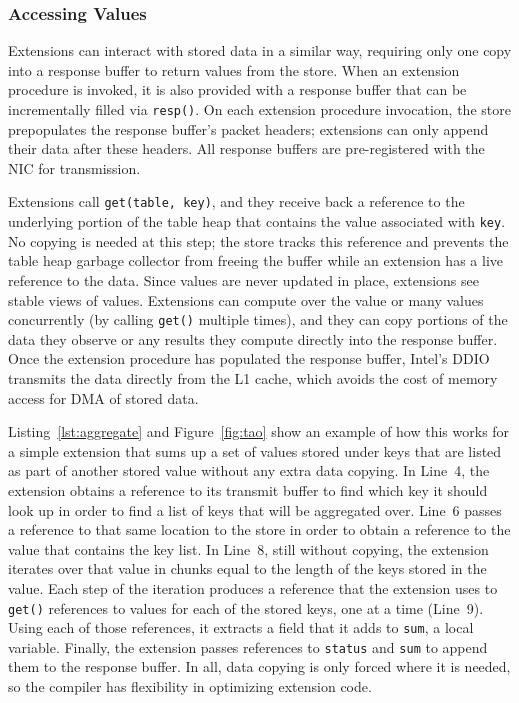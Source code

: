 \subsubsection{Accessing Values}
\label{sec:access}

Extensions can interact with stored data in a similar way, requiring only one
  copy into a response buffer to return values from the store.
When an extension procedure is invoked, it is also provided with a response
  buffer that can be incrementally filled via \texttt{resp()}.
On each extension procedure invocation, the store prepopulates the response
  buffer's packet headers; extensions can only append their data after these
  headers.
All response buffers are pre-registered with the NIC for transmission.

Extensions call \texttt{get(table, key)}, and they receive back a reference to
  the underlying portion of the table heap that contains the value associated
  with \texttt{key}.
No copying is needed at this step; the store tracks this reference and prevents the table
  heap garbage collector from freeing the buffer while an extension has a live
  reference to the data.
Since values are never updated in place, extensions see stable views of values.
Extensions can compute over the value or many values concurrently (by calling \texttt{get()} multiple times), and they can
  copy portions of the data they observe or any results they compute directly into
  the response buffer.
Once the extension procedure has populated the response buffer, Intel's
  DDIO~\cite{ddio} transmits the data directly from the L1 cache, which avoids
  the cost of memory access for DMA of stored data.

Listing~\ref{lst:aggregate} and Figure~\ref{fig:tao} show an example of how
  this works for a simple extension that sums up a set of values stored under
  keys that are listed as part of another stored value without any extra data copying.
In Line~4, the extension obtains a reference to its transmit buffer to find
  which key it should look up in order to find a list of keys that will be aggregated over.
Line~6 passes a reference to that same location to the store in order to
  obtain a reference to the value that contains the key list.
In Line~8, still without copying, the extension iterates over that value in
  chunks equal to the length of the keys stored in the value.
Each step of the iteration produces a reference that the extension uses
to \texttt{get()}
  references to values for each of the stored keys, one at a time (Line~9).
Using each of those references, it extracts a field that it adds to
  \texttt{sum}, a local variable.
Finally, the extension passes references to \texttt{status} and \texttt{sum} to append
  them to the response buffer.
In all, data copying is only forced where it is needed, so the compiler has
  flexibility in optimizing extension code.

